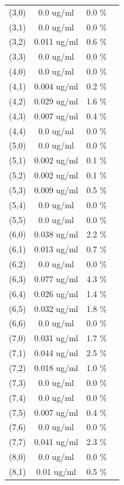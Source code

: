 \documentclass{article}
\begin{document}
\begin{tabular}{c c c c}
(3,0)&        0.0 ug/ml        &0.0 \%\\
(3,1)&        0.0 ug/ml        &0.0 \%\\
(3,2)&        0.011 ug/ml        &0.6 \%\\
(3,3)&        0.0 ug/ml        &0.0 \%\\
(4,0)&        0.0 ug/ml        &0.0 \%\\
(4,1)&        0.004 ug/ml        &0.2 \%\\
(4,2)&        0.029 ug/ml        &1.6 \%\\
(4,3)&        0.007 ug/ml        &0.4 \%\\
(4,4)&        0.0 ug/ml        &0.0 \%\\
(5,0)&        0.0 ug/ml        &0.0 \%\\
(5,1)&        0.002 ug/ml        &0.1 \%\\
(5,2)&        0.002 ug/ml        &0.1 \%\\
(5,3)&        0.009 ug/ml        &0.5 \%\\
(5,4)&        0.0 ug/ml        &0.0 \%\\
(5,5)&        0.0 ug/ml        &0.0 \%\\
(6,0)&        0.038 ug/ml        &2.2 \%\\
(6,1)&        0.013 ug/ml        &0.7 \%\\
(6,2)&        0.0 ug/ml        &0.0 \%\\
(6,3)&        0.077 ug/ml        &4.3 \%\\
(6,4)&        0.026 ug/ml        &1.4 \%\\
(6,5)&        0.032 ug/ml        &1.8 \%\\
(6,6)&        0.0 ug/ml        &0.0 \%\\
(7,0)&        0.031 ug/ml        &1.7 \%\\
(7,1)&        0.044 ug/ml        &2.5 \%\\
(7,2)&        0.018 ug/ml        &1.0 \%\\
(7,3)&        0.0 ug/ml        &0.0 \%\\
(7,4)&        0.0 ug/ml        &0.0 \%\\
(7,5)&        0.007 ug/ml        &0.4 \%\\
(7,6)&        0.0 ug/ml        &0.0 \%\\
(7,7)&        0.041 ug/ml        &2.3 \%\\
(8,0)&        0.0 ug/ml        &0.0 \%\\
(8,1)&        0.01 ug/ml        &0.5 \%\\

\end{tabular}
\end{document}
